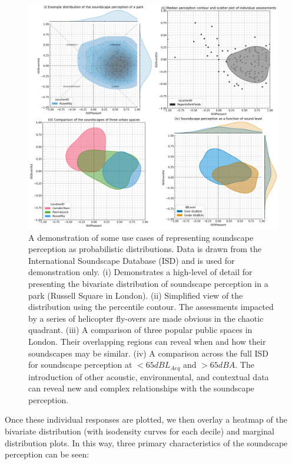 \begin{figure}[!ht]
  \centering
  \includegraphics[width=\textwidth]{Figures/jasa-el_Figure2.png}
  \caption{\linespread{1}\selectfont{} A demonstration of some use cases of representing soundscape perception as probabilistic distributions. Data is drawn from the International Soundscape Database (ISD) and is used for demonstration only. (i) Demonstrates a high-level of detail for presenting the bivariate distribution of soundscape perception in a park (Russell Square in London). (ii) Simplified view of the distribution using the  percentile contour. The assessments impacted by a series of helicopter fly-overs are made obvious in the chaotic quadrant. (iii) A comparison of three popular public spaces in London. Their overlapping regions can reveal when and how their soundscapes may be similar. (iv) A comparison across the full ISD for soundscape perception at $<65 dB L_{Aeq}$ and $> 65 dBA$. The introduction of other acoustic, environmental, and contextual data can reveal new and complex relationships with the soundscape perception. \label{fig:circ}}
\end{figure}

Once these individual responses are plotted, we then overlay a heatmap of the bivariate distribution (with isodensity curves for each decile) and marginal distribution plots. In this way, three primary characteristics of the soundscape perception can be seen:


